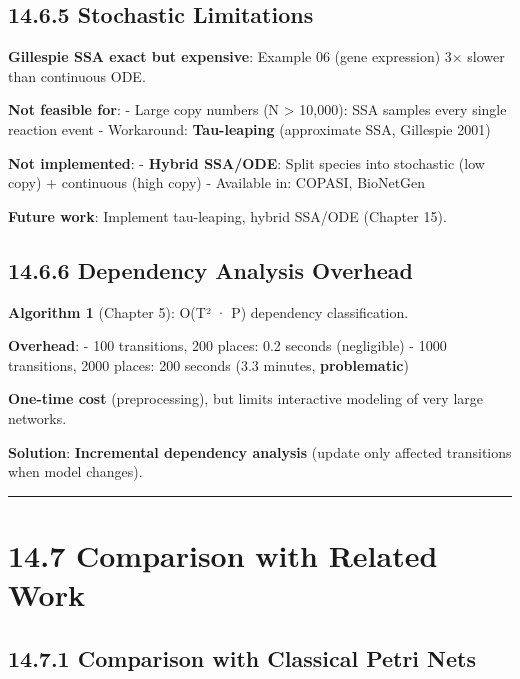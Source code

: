 \hypertarget{stochastic-limitations}{%
\subsection{14.6.5 Stochastic
Limitations}\label{stochastic-limitations}}

\textbf{Gillespie SSA exact but expensive}: Example 06 (gene expression)
3× slower than continuous ODE.

\textbf{Not feasible for}: - Large copy numbers (N \textgreater{}
10,000): SSA samples every single reaction event - Workaround:
\textbf{Tau-leaping} (approximate SSA, Gillespie 2001)

\textbf{Not implemented}: - \textbf{Hybrid SSA/ODE}: Split species into
stochastic (low copy) + continuous (high copy) - Available in: COPASI,
BioNetGen

\textbf{Future work}: Implement tau-leaping, hybrid SSA/ODE (Chapter
15).

\hypertarget{dependency-analysis-overhead}{%
\subsection{14.6.6 Dependency Analysis
Overhead}\label{dependency-analysis-overhead}}

\textbf{Algorithm 1} (Chapter 5): O(\textbar T\textbar² ·
\textbar P\textbar) dependency classification.

\textbf{Overhead}: - 100 transitions, 200 places: 0.2 seconds
(negligible) - 1000 transitions, 2000 places: 200 seconds (3.3 minutes,
\textbf{problematic})

\textbf{One-time cost} (preprocessing), but limits interactive modeling
of very large networks.

\textbf{Solution}: \textbf{Incremental dependency analysis} (update only
affected transitions when model changes).

\begin{center}\rule{0.5\linewidth}{0.5pt}\end{center}

\hypertarget{comparison-with-related-work}{%
\section{14.7 Comparison with Related
Work}\label{comparison-with-related-work}}

\hypertarget{comparison-with-classical-petri-nets}{%
\subsection{14.7.1 Comparison with Classical Petri
Nets}\label{comparison-with-classical-petri-nets}}

